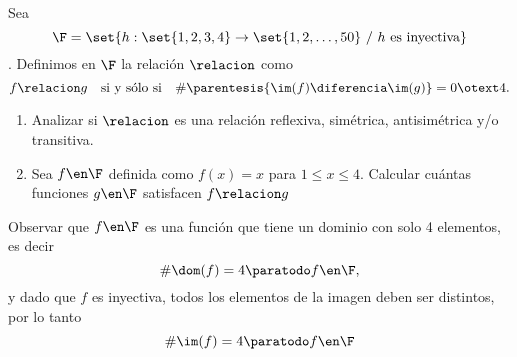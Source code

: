 \begin{enunciado}{\ejExtra}
  Sea
  $$ \F = \set{h : \set{1,2,3,4} \to \set{1,2,\dots, 50} \ /\  h \text{ es inyectiva}} $$.
  Definimos en $\F$ la relación $\relacion$ como
  $$
    f \relacion g \quad \text{si y sólo si} \quad \# \parentesis{ \im(f) \diferencia \im(g) } = 0 \otext 4.
  $$
  \begin{enumerate}[label=\alph*)]
    \item Analizar si $\relacion$ es una relación reflexiva, simétrica, antisimétrica y/o transitiva.

    \item Sea
          $f \en \F$
          definida como $f(x) = x$ para $1 \leq x \leq 4$. Calcular cuántas funciones $g \en \F$
          satisfacen $f \relacion g$
  \end{enumerate}
\end{enunciado}

Observar que $f \en \F$ es una función que tiene un dominio con solo 4 elementos, es decir
$$
  \# \dom(f) = 4 \paratodo f \en \F,
$$
y dado que $f$ es inyectiva, todos los elementos de la imagen deben ser distintos, por lo tanto
$$
  \# \im(f) = 4 \paratodo f \en \F
$$

